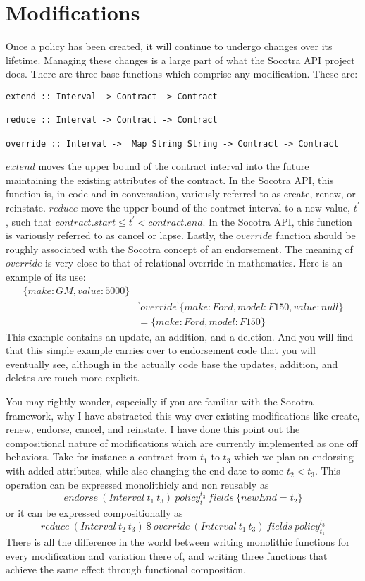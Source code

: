 \section{Modifications}
\label{sec:01:4}
Once a policy has been created, it will continue to undergo changes over its lifetime. Managing these changes is a large part of
what the Socotra API project does. There are three base functions which comprise any modification. These are:
\begin{lstlisting}
extend :: Interval -> Contract -> Contract

reduce :: Interval -> Contract -> Contract

override :: Interval ->  Map String String -> Contract -> Contract
\end{lstlisting}
$extend$ moves the upper bound of the contract interval into the future maintaining the existing attributes of the contract. In
the Socotra API, this function is, in code and in conversation, variously referred to as create, renew, or reinstate. $reduce$ move
the upper bound of the contract interval to a new value, $t^\prime$, such that $contract.start \leq t^\prime < contract.end$.
In the Socotra API, this function is variously referred to as cancel or lapse. Lastly, the $override$ function should be roughly
associated with the Socotra concept of an endorsement. The meaning of $override$ is very close to that of relational override in mathematics.
Here is an example of its use:
\begin{eqnarray*}
\{make: GM, value: 5000\} & \\
& { ^\backprime}overrid{e^\backprime} \{make: Ford, model: F150, value: null\} \\
& = \{make: Ford, model: F150\}
\end{eqnarray*}
This example contains an update, an addition, and a deletion. And you will find that this simple example carries
over to endorsement code that you will eventually see, although in the actually code base the updates,
addition, and deletes are much more explicit.

You may rightly wonder, especially if you are familiar with the Socotra framework, why I have abstracted this
way over existing modifications like create, renew, endorse, cancel, and reinstate. I have done this point out
the compositional nature of modifications which are currently implemented as one off behaviors. Take for instance
a contract from $t_1$ to $t_3$ which we plan on endorsing with added attributes, while also changing the end date
to some $t_2 < t_3$. This operation can be expressed monolithicly and non reusably as
\begin{equation*}
endorse \: (Interval \: t_1 \: t_3) \: policy_{t_1}^{t_3} \: fields \: \{newEnd = t_2\}
\end{equation*}
or it can be expressed compositionally as
\begin{equation*}
reduce \: (Interval \: t_2 \: t_3) \: \$ \: override \: (Interval \: t_1 \: t_3) \: fields \: policy_{t_1}^{t_3}
\end{equation*}
There is all the difference in the world between writing monolithic functions for every modification and variation
there of, and writing three functions that achieve the same effect through functional composition.

